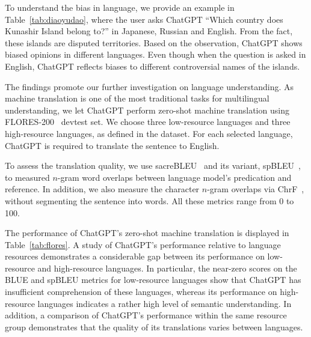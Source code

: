 To understand the bias in language, we provide an example in Table~\ref{tab:diaoyudao}, where the user asks ChatGPT ``Which country does Kunashir Island belong to?'' in Japanese, Russian and English. From the fact, these islands are disputed territories. Based on the observation, ChatGPT shows biased opinions in different languages. Even though when the question is asked in English, ChatGPT reflects biases to different controversial names of the islands.

The findings promote our further investigation on language understanding. As machine translation is one of the most traditional tasks for multilingual understanding, we let ChatGPT perform zero-shot machine translation using FLORES-200~\cite{team2022NoLL} devtest set. We choose three low-resource languages and three high-resource languages, as defined in the dataset. For each selected language, ChatGPT is required to translate the sentence to English.

To assess the translation quality, we use sacreBLEU~\cite{post-2018-call} and its variant, spBLEU~\cite{goyal2022flores}, to measured $n$-gram word overlaps between language model's predication and reference. In addition, we also measure the character $n$-gram overlaps via ChrF~\cite{popovic2015chrf}, without segmenting the sentence into words. All these metrics range from 0 to 100.


The performance of ChatGPT's zero-shot machine translation is displayed in Table~\ref{tab:flores}. A study of ChatGPT's performance relative to language resources demonstrates a considerable gap between its performance on low-resource and high-resource languages. In particular, the near-zero scores on the BLUE and spBLEU metrics for low-resource languages show that ChatGPT has insufficient comprehension of these languages, whereas its performance on high-resource languages indicates a rather high level of semantic understanding. In addition, a comparison of ChatGPT's performance within the same resource group demonstrates that the quality of its translations varies between languages.


